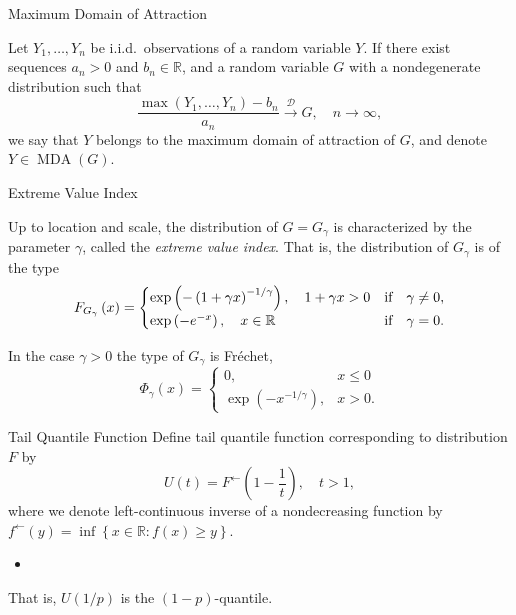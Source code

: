 \documentclass[11pt, aspectratio=169]{beamer}
\DeclareMathOperator{\mda}{MDA}
\begin{document}
\begin{frame}{Maximum Domain of Attraction}
  \begin{definition}
    Let $Y_1, \ldots, Y_n$ be i.i.d.\ observations of a random variable $Y$. If
    there exist sequences $a_n > 0$ and $b_n\in\mathbb{R}$, and a random
    variable $G$ with a nondegenerate distribution such that
    \begin{equation*}
	    \frac{\max\left(Y_1, \ldots, Y_n\right) - b_n}{a_n}
      \stackrel{\mathcal{D}}{\to} G, \quad n\to\infty,
    \end{equation*}
    we say that $Y$ belongs to the maximum domain of attraction of $G$, and
    denote $Y\in\mda\left(G\right)$.
  \end{definition}
\end{frame}

\begin{frame}{Extreme Value Index}
  \begin{theorem}
    Up to location and scale, the distribution of $G = G_\gamma$ is
    characterized by the parameter $\gamma$, called the \emph{extreme value
    index}. That is, the distribution of ${G_\gamma}$ is of the type
    \begin{equation*}
      F_{G_\gamma}\left(x\right) =
      \begin{cases}
        \exp\left(-\left(1 + \gamma x\right)^{-1/\gamma}\right),
        \quad 1 + \gamma x > 0 &\textnormal{if}\quad \gamma\neq 0, \\
        \exp\left(-e^{-x}\right),
        \quad x\in\mathbb{R} &\textnormal{if}\quad \gamma = 0.
      \end{cases}
    \end{equation*}
  \end{theorem}
  \pause
  In the case $\gamma > 0$ the type of $G_\gamma$ is Fr\'echet,
  \begin{equation*}
    \Phi_\gamma\left(x\right) =
    \begin{cases}
      0, & x\leq 0 \\
      \exp\left(-x^{-1/\gamma}\right), & x > 0.
    \end{cases}
  \end{equation*}
\end{frame}

\begin{frame}{Tail Quantile Function}
  Define tail quantile function corresponding to distribution $F$ by
  \begin{equation*}
    U\left(t\right) = F^{\leftarrow}\left(1 - \frac{1}{t}\right), \quad t > 1,
  \end{equation*}
  where we denote left-continuous inverse of a nondecreasing function by
  $f^\leftarrow\left(y\right) = \inf\left\{x\in\mathbb{R} : f(x) \geq y\right\}$.
  \pause
  \begin{itemize}
    \item[] 
  \end{itemize}
  That is, $U\left(1/p\right)$ is the $(1-p)$-quantile.
\end{frame}
\end{document}
